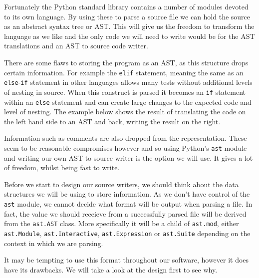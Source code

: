\documentclass{report}
\begin{document}
Fortunately the Python standard library contains a number of modules devoted to its own language. By using these to parse a source file
we can hold the source as an abstract syntax tree or AST. This will give us the freedom to transform the language as we like and the only code we
will need to write would be for the AST translations and an AST to source code writer.

There are some flaws to storing the program as an AST, as this structure drops certain information.
For example the \texttt{elif} statement, meaning the same as an \texttt{else}-\texttt{if} statement in other languages allows many tests without
additional levels of nesting in source. When this construct is parsed it becomes an \texttt{if} statement within an \texttt{else} statement and
can create large changes to the expected code and level of nesting. The example below shows the result of translating the code on the left hand
side to an AST and back, writing the result on the right.

\begin{minipage}[b]{0.4\linewidth}
\centering

\end{minipage}
\hspace{1cm}
\begin{minipage}[b]{0.5\linewidth}
\centering

\end{minipage}

Information such as comments are also dropped from the representation. These seem to be reasonable compromises however and so
using Python's \texttt{ast} module and writing our own AST to source writer is the option we will use. It gives a lot of freedom, whilst
being fast to write.

Before we start to design our source writers, we should think about the data structures we will be using to store information. As we don't have
control of the \texttt{ast} module, we cannot decide what format will be output when parsing a file. In fact, the value we should receieve from
a successfully parsed file will be derived from the \texttt{ast.AST} class. More specifically it will be a child of \texttt{ast.mod}, either
\texttt{ast.Module}, \texttt{ast.Interactive}, \texttt{ast.Expression} or \texttt{ast.Suite} depending on the context in which we are parsing.

It may be tempting to use this format throughout our software, however it does have its drawbacks. We will take a look at the design first to see why.
\end{document}
